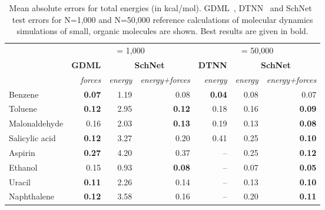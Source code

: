 \documentclass[aip,jcp,reprint,graphicx]{revtex4-1}
\begin{document}
\begin{table*}
	\caption{\label{tab:mdenergies}Mean absolute errors for total energies (in kcal/mol). GDML~\citep{chmiela2017machine}, DTNN~\citep{schutt2017quantum} and SchNet~\citep{schutt2017schnet} test errors for  N=1,000 and N=50,000 reference calculations of molecular dynamics simulations of small, organic molecules are shown. Best results are given in bold.}
	\begin{ruledtabular}
		\begin{tabular}{lrrrrrr}
			                                 &                       \multicolumn{3}{c}{ = 1,000}                        &                       \multicolumn{3}{c}{ = 50,000}                       \\ \cline{2-4}\cline{5-7}
			                                 &   \textbf{GDML} &            \multicolumn{2}{c}{\textbf{SchNet}}             &   \textbf{DTNN} &            \multicolumn{2}{c}{\textbf{SchNet}}             \\ \cline{2-2}\cline{3-4}\cline{5-5}\cline{6-7}
			\raggedleft{\textit{trained on}} & \textit{forces} & \textit{energy} & \textit{energy+forces}  & \textit{energy} & \textit{energy} & \textit{energy+forces} \\ \hline
			Benzene                          &   \textbf{0.07} &            1.19 &                   0.08                  &   \textbf{0.04} &            0.08 &                   0.07  \\
			Toluene                          &   \textbf{0.12} &            2.95 &          \textbf{0.12}                  &            0.18 &            0.16 &          \textbf{0.09}  \\
			Malonaldehyde                    &            0.16 &            2.03 &         \textbf{ 0.13}                  &            0.19 &            0.13 &          \textbf{0.08}  \\
			Salicylic acid                   &   \textbf{0.12} &            3.27 &                   0.20                  &            0.41 &            0.25 &          \textbf{0.10}  \\
			Aspirin                          &   \textbf{0.27} &            4.20 &                   0.37                  &              -- &            0.25 &          \textbf{0.12}  \\
			Ethanol                          &            0.15 &            0.93 &          \textbf{0.08}                  &              -- &            0.07 &          \textbf{0.05}  \\
			Uracil                           &   \textbf{0.11} &            2.26 &                   0.14                  &              -- &            0.13 &          \textbf{0.10}  \\
			Naphthalene                       &  \textbf{ 0.12} &            3.58 &                   0.16                  &              -- &            0.20 &          \textbf{0.11} 
		\end{tabular}
	\end{ruledtabular}
\end{table*}
\end{document}
